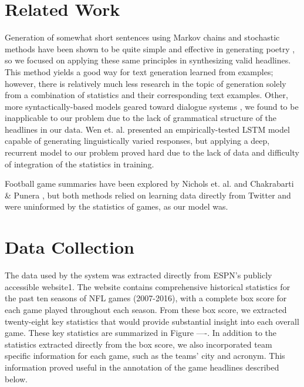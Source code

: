 \documentclass[12pt, journal]{IEEEtran}
\begin{document}

%
%
\section{Related Work}
Generation of somewhat short sentences using Markov chains and stochastic methods have
been shown to be quite simple and effective in generating poetry \cite{1}\cite{2}, so we focused on applying these same principles in synthesizing valid headlines. This method yields a good way for text generation learned from examples; however, there is relatively much less research in the topic of generation solely from a combination of statistics and their corresponding text examples. Other, more syntactically-based models geared toward dialogue systems \cite{3}\cite{4}, we found to be inapplicable to our problem due to the lack of grammatical structure of the headlines in our data. Wen et. al. \cite{5} presented an empirically-tested LSTM model capable of generating linguistically varied responses, but applying a deep, recurrent model to our problem proved hard due to the lack of data and difficulty of integration of the statistics in training.


Football game summaries have been explored by Nichols et. al. \cite{6} and Chakrabarti \& Punera \cite{7}, but both methods relied on learning data directly from Twitter and were uninformed by the statistics of games, as our model was. 

\section{Data Collection}

The data used by the system was extracted directly from ESPN's publicly accessible website1. The website contains comprehensive historical statistics for the past ten seasons of NFL games (2007-2016), with a complete box score for each game played throughout each season. From these box score, we extracted twenty-eight key statistics that would provide substantial insight into each overall game. These key statistics are summarized in Figure ----. In addition to the statistics extracted directly from the box score, we also incorporated team specific information for each game, such as the teams' city and acronym. This information proved useful in the annotation of the game headlines described below.
\end{document}
